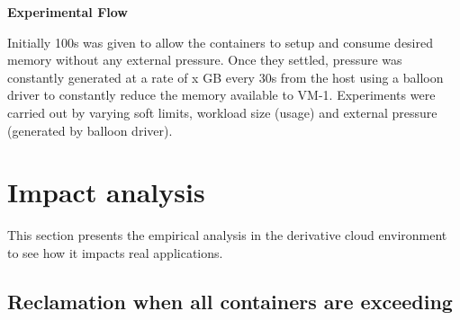     \noindent \textbf{Experimental Flow}
    
    Initially 100s was given to allow the containers to setup and consume desired memory without any external pressure. Once they 
settled, pressure was constantly generated at a rate of x GB every 30s from the host using a balloon driver to constantly reduce the 
memory available to VM-1. Experiments were carried out by varying soft limits, workload size (usage) and external pressure (generated by 
balloon driver). 
    
    \section{Impact analysis}
    
      This section presents the empirical analysis in the derivative cloud environment to see how it impacts real applications.
    
      \subsection{Reclamation when all containers are exceeding}
      
